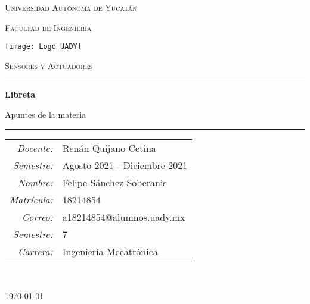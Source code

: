 \documentclass[Libreta.tex]{subfiles}
\begin{document}
\thispagestyle{empty}
\setcounter{page}{0}

{
    \centering
    \setlength{\parindent}{0pt}

    {\LARGE\textsc{Universidad Autónoma de Yucatán}\\}

    {\large\textsc{Facultad de Ingeniería}\\}

    \vspace{2em}

    \texttt{[image: Logo UADY]}

    \vspace{1em}

    {\Large\textsc{Sensores y Actuadores}\\}

    \vspace{1em}

    \rule{\textwidth}{1pt}

    {\LARGE\textbf{Libreta}\\}

    {\large Apuntes de la materia\\}

    \rule{\textwidth}{1pt}

    \vspace{3em}

    {
        \raggedright
        \begin{tabular}{r l}
            \textit{Docente:} & Renán Quijano Cetina \\

            \textit{Semestre:} & Agosto 2021 - Diciembre 2021 \\

            \textit{Nombre:} & Felipe Sánchez Soberanis \\

            \textit{Matrícula:} & 18214854 \\

            \textit{Correo:} & a18214854@alumnos.uady.mx \\

            \textit{Semestre:} & 7 \\

            \textit{Carrera:} & Ingeniería Mecatrónica
        \end{tabular}
    \\}

    \vfill

    {
        \raggedleft
        \today
    \\}
}
\end{document}
